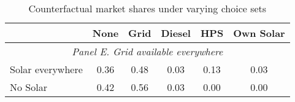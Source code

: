 \begin{table}[htbp]\centering
\caption{Counterfactual market shares under varying choice sets\label{tab:counterfactual}}
\begin{tabular}{l*{5}{c}}
\toprule
            &        None&        Grid&      Diesel&         HPS&   Own Solar\\
\midrule

\multicolumn{6}{c}{\emph{Panel E. Grid available everywhere}}\\
Solar everywhere&    \cellcolor{yellow}     0.36&        0.48&        0.03&    \cellcolor{yellow}     0.13&  \cellcolor{yellow}       0.03\\
No Solar    &   \cellcolor{yellow}      0.42&        0.56&        0.03&        \cellcolor{yellow} 0.00&   \cellcolor{yellow}      0.00\\
\bottomrule
\end{tabular}
\end{table}
